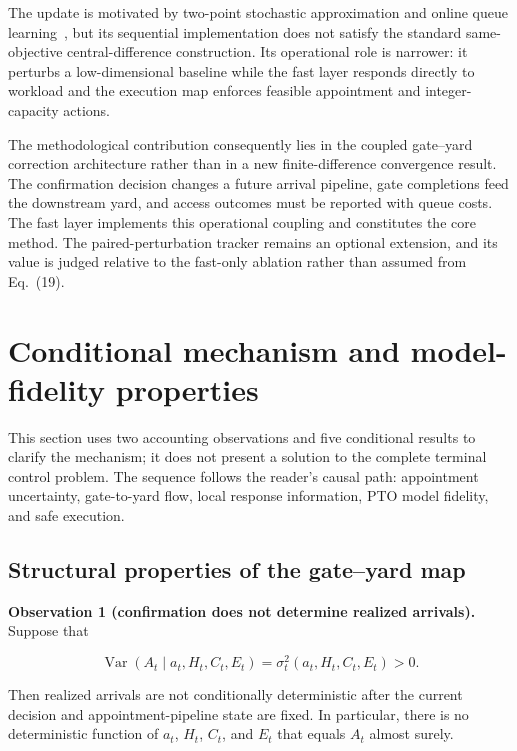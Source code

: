 \documentclass[preprint,12pt,authoryear,a4paper]{elsarticle}
\begin{document}
The update is motivated by two-point stochastic approximation and online queue learning~\citep{RobbinsMonro1951StochasticApproximation,KushnerYin2003StochasticApproximation,ChenHongLiu2026QueueLearning}, but its sequential implementation does not satisfy the standard same-objective central-difference construction. Its operational role is narrower: it perturbs a low-dimensional baseline while the fast layer responds directly to workload and the execution map enforces feasible appointment and integer-capacity actions.

The methodological contribution consequently lies in the coupled gate--yard correction architecture rather than in a new finite-difference convergence result. The confirmation decision changes a future arrival pipeline, gate completions feed the downstream yard, and access outcomes must be reported with queue costs. The fast layer implements this operational coupling and constitutes the core method. The paired-perturbation tracker remains an optional extension, and its value is judged relative to the fast-only ablation rather than assumed from Eq.~(19).

\section{Conditional mechanism and model-fidelity properties}
\label{sec:analytical-properties}

This section uses two accounting observations and five conditional results to clarify the mechanism; it does not present a solution to the complete terminal control problem. The sequence follows the reader's causal path: appointment uncertainty, gate-to-yard flow, local response information, PTO model fidelity, and safe execution.

\subsection{Structural properties of the gate--yard map}
\label{subsec:5-1-structural-properties-of-the-gate-yard-map}

\noindent\textbf{Observation 1 (confirmation does not determine realized arrivals).} Suppose that

\[
\operatorname{Var}(A_t\mid a_t,H_t,C_t,E_t)
=\sigma_t^2(a_t,H_t,C_t,E_t)>0.
\]

Then realized arrivals are not conditionally deterministic after the current decision and appointment-pipeline state are fixed. In particular, there is no deterministic function of \(a_t\), \(H_t\), \(C_t\), and \(E_t\) that equals \(A_t\) almost surely.
\end{document}
